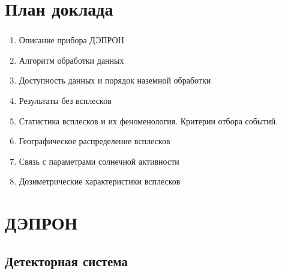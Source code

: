 \documentclass[t, aspectratio=43]{beamer}
\begin{document}
\section{План доклада}\label{header-n26}
\begin{frame}	
\frametitle{\insertsection} 
\begin{enumerate}
	\def\labelenumi{\arabic{enumi}.}
	\item
	Описание прибора ДЭПРОН
	\item
	Алгоритм обработки данных
	\item
	Доступность данных и порядок наземной обработки
	\item
	Результаты без всплесков
	\item
	Статистика всплесков и их феноменология. Критерии отбора событий.
	\item
	Географическое распределение всплесков
	\item
	Связь с параметрами солнечной активности
	\item
	Дозиметрические характеристики всплесков
\end{enumerate}

\end{frame}



\section{ДЭПРОН}
\subsection{Детекторная система}
\end{document}
